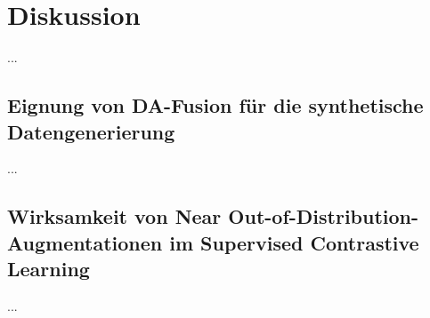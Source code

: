 \chapter{Diskussion} \label{sec:discussion}

...


\section{Eignung von DA-Fusion für die synthetische Datengenerierung} \label{sec:da-fusion-discussion}


...

\section{Wirksamkeit von Near Out-of-Distribution-Augmentationen im Supervised Contrastive Learning} \label{sec:ood-discussion}



...
